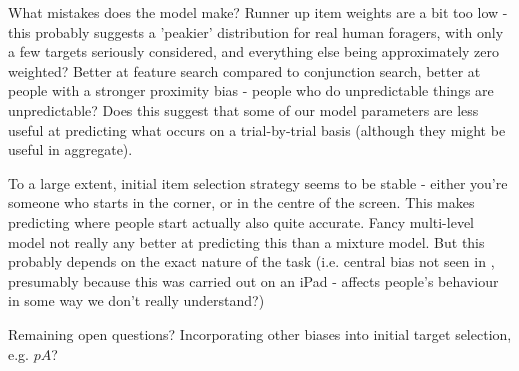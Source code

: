 \documentclass[vision,article,submit,pdftex,moreauthors]{Definitions/mdpi}
\begin{document}
What mistakes does the model make? 
Runner up item weights are a bit too low - this probably suggests a 'peakier' distribution for real human foragers, with only a few targets seriously considered, and everything else being approximately zero weighted?
Better at feature search compared to conjunction search, better at people with a stronger proximity bias - people who do unpredictable things are unpredictable? Does this suggest that some of our model parameters are less useful at predicting what occurs on a trial-by-trial basis (although they might be useful in aggregate).

To a large extent, initial item selection strategy seems to be stable - either you're someone who starts in the corner, or in the centre of the screen. This makes predicting where people start actually also quite accurate. Fancy multi-level model not really any better at predicting this than a mixture model. But this probably depends on the exact nature of the task (i.e. central bias not seen in \citep{kristjansson2014}, presumably because this was carried out on an iPad - affects people's behaviour in some way we don't really understand?)

Remaining open questions?
Incorporating other biases into initial target selection, e.g. $pA$?


\vspace{6pt} 




\end{document}

